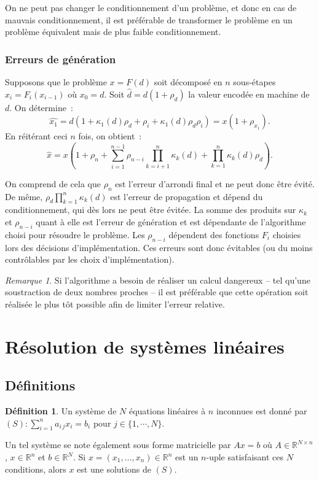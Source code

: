 \documentclass{article}
\theoremstyle{definition}
\newtheorem{déf}[thm]{Définition}
\theoremstyle{remark}
\newtheorem*{rmq}{Remarque}
\newcommand{\R}{\mathbb R}
\begin{document}
		On ne peut pas changer le conditionnement d'un problème, et donc en cas de mauvais conditionnement, il est préférable de transformer le problème en un
		problème équivalent mais de plus faible conditionnement.

		\subsubsection{Erreurs de génération}
		Supposons que le problème $x = F(d)$ soit décomposé en $n$ sous-étapes $x_i = F_i(x_{i-1})$ où $x_0 = d$. Soit $\widehat d = d(1+\rho_d)$ la valeur
		encodée en machine de $d$. On détermine~:
		\[\widehat {x_1} = d(1 + \kappa_1(d)\rho_d + \rho_i + \kappa_1(d)\rho_d\rho_i) = x(1 + \rho_{x_1}).\]
		En réitérant ceci $n$ fois, on obtient~:
		\[\widehat x = x\left(1 + \rho_n + \sum_{i=1}^{n-1}\rho_{n-i}\prod_{k=i+1}^{n}\kappa_k(d) + \prod_{k=1}^n\kappa_k(d)\rho_d\right).\]

		On comprend de cela que $\rho_n$ est l'erreur d'arrondi final et ne peut donc être évité. De même, $\rho_d\prod_{k=1}^n\kappa_k(d)$ est l'erreur de
		propagation et dépend du conditionnement, qui dès lors ne peut être évitée. La somme des produits sur $\kappa_k$ et $\rho_{n-i}$ quant à elle est
		l'erreur de génération et est dépendante de l'algorithme choisi pour résoudre le problème. Les $\rho_{n-i}$ dépendent des fonctions $F_i$ choisies lors
		des décisions d'implémentation. Ces erreurs sont donc évitables (ou du moins contrôlables par les choix d'implémentation).

		\begin{rmq} Si l'algorithme a besoin de réaliser un calcul dangereux -- tel qu'une soustraction de deux nombres proches -- il est préférable que cette
		opération soit réalisée le plus tôt possible afin de limiter l'erreur relative.
		\end{rmq}

\newpage
\section{Résolution de systèmes linéaires}
	\subsection{Définitions}
		\begin{déf}Un système de $N$ équations linéaires à $n$ inconnues est donné par $(S) : \sum_{i=1}^na_{i\,j}x_i = b_i$ pour $j \in \{1, \dotsb, N\}$.

		Un tel système se note également sous forme matricielle par $Ax = b$ où $A \in \R^{N \times n}$, $x \in \R^n$ et $b \in \R^N$.
		Si $x = (x_1, \dotsc, x_n) \in \R^n$ est un $n$-uple satisfaisant ces $N$ conditions, alors $x$ est une solutions de $(S)$.
		\end{déf}
\end{document}
